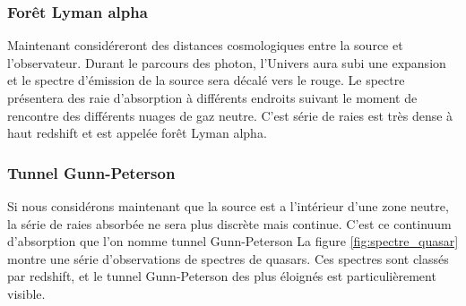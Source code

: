 \subsubsection*{Forêt Lyman alpha}

Maintenant considéreront des distances cosmologiques entre la source et l'observateur.
Durant le parcours des photon, l'Univers aura subi une expansion et le spectre d'émission de la source sera décalé vers le rouge.
Le spectre présentera des raie d’absorption à différents endroits suivant le moment de rencontre des différents nuages de gaz neutre.
C'est série de raies est très dense à haut redshift et est appelée forêt Lyman alpha.

\subsubsection*{Tunnel Gunn-Peterson}

Si nous considérons maintenant que la source est a l’intérieur d'une zone neutre, la série de raies absorbée ne sera plus discrète mais continue.
C'est ce continuum d’absorption que l'on nomme tunnel Gunn-Peterson \cite{1965ApJ...141.1295S}
La figure \ref{fig:spectre_quasar} montre une série d'observations de spectres de quasars.
Ces spectres sont classés par redshift, et le tunnel Gunn-Peterson des plus éloignés est particulièrement visible.


